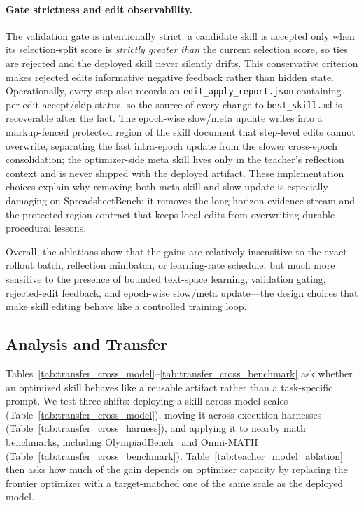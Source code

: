 \documentclass{llmxive}
\begin{document}
\paragraph{Gate strictness and edit observability.}
The validation gate is intentionally strict: a candidate skill is accepted only when its selection-split score is \emph{strictly greater than} the current selection score, so ties are rejected and the deployed skill never silently drifts. This conservative criterion makes rejected edits informative negative feedback rather than hidden state. Operationally, every step also records an \texttt{edit\_apply\_report.json} containing per-edit accept/skip status, so the source of every change to \texttt{best\_skill.md} is recoverable after the fact. The epoch-wise slow/meta update writes into a markup-fenced protected region of the skill document that step-level edits cannot overwrite, separating the fast intra-epoch update from the slower cross-epoch consolidation; the optimizer-side meta skill lives only in the teacher's reflection context and is never shipped with the deployed artifact. These implementation choices explain why removing both meta skill and slow update is especially damaging on SpreadsheetBench: it removes the long-horizon evidence stream and the protected-region contract that keeps local edits from overwriting durable procedural lessons.

Overall, the ablations show that the gains are relatively insensitive to the exact rollout batch, reflection minibatch, or learning-rate schedule, but much more sensitive to the presence of bounded text-space learning, validation gating, rejected-edit feedback, and epoch-wise slow/meta update---the design choices that make skill editing behave like a controlled training loop.

\subsection{Analysis and Transfer}
\label{sec:analysis_transfer}

Tables~\ref{tab:transfer_cross_model}--\ref{tab:transfer_cross_benchmark} ask whether an optimized skill behaves like a reusable artifact rather than a task-specific prompt. We test three shifts: deploying a skill across model scales (Table~\ref{tab:transfer_cross_model}), moving it across execution harnesses (Table~\ref{tab:transfer_cross_harness}), and applying it to nearby math benchmarks, including OlympiadBench~\citep{he2024olympiadbench} and Omni-MATH~\citep{gao2024omnimathuniversalolympiadlevel} (Table~\ref{tab:transfer_cross_benchmark}). Table~\ref{tab:teacher_model_ablation} then asks how much of the gain depends on optimizer capacity by replacing the frontier optimizer with a target-matched one of the same scale as the deployed model.
\end{document}

